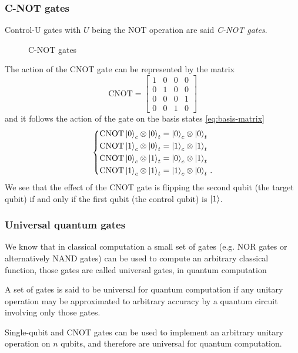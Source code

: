 \subsubsection{C-NOT gates}
Control-U gates with $U$ being the NOT operation are said \emph{C-NOT gates}.
\begin{figure}[htb]
\centerline{}
\caption{C-NOT gates}
\label{fig:controlled-note}
\end{figure}

The action of the CNOT gate can be represented by the matrix
\begin{equation*}
      \text{CNOT} =  \begin{bmatrix}
    1 & 0 & 0 & 0\\
    0 & 1 & 0 & 0 \\
    0 & 0 & 0 & 1 \\
    0 & 0 & 1 & 0
    \end{bmatrix} 
\end{equation*}
and it follows the action of the gate on the basis states \eqref{eq:basis-matrix}
\begin{equation*}
\left\{
\begin{aligned}
&\text{CNOT} \ket{0}_c \otimes \ket{0}_t = \ket{0}_c \otimes \ket{0}_t \\
&\text{CNOT} \ket{1}_c \otimes \ket{0}_t = \ket{1}_c \otimes \ket{1}_t \\
&\text{CNOT} \ket{0}_c \otimes \ket{1}_t = \ket{0}_c \otimes \ket{1}_t \\
&\text{CNOT} \ket{1}_c \otimes \ket{1}_t = \ket{1}_c \otimes \ket{0}_t\,.
\end{aligned}
\right.
\end{equation*}
We see that the effect of the CNOT gate is flipping the second qubit (the target qubit) if and only if the first qubit (the control qubit) is $\ket{1}$.
\subsubsection{Universal quantum gates}
We know that in classical computation a small set of gates (e.g. NOR gates or alternatively NAND gates) can be used to compute an arbitrary classical function, those gates are called universal gates, in quantum computation
\begin{defn}
A set of gates is said to be universal for quantum computation if any unitary operation may be approximated to arbitrary accuracy by a quantum circuit involving only those gates.
\end{defn}
\begin{theorem}
Single-qubit and CNOT gates can be used to implement an arbitrary unitary operation on $n$ qubits,
and therefore are universal for quantum computation. \cite{NielsenChuang}
\end{theorem}

